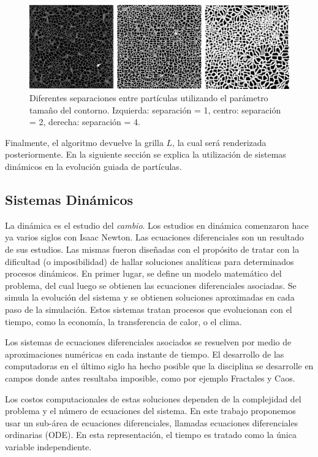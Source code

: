 \documentclass[oneside,a4paper,spanish,links]{amca}
\begin{document}
\begin{figure}[htb!]
  \centerline{\includegraphics[scale=0.22]{fig1.pdf}}
  \caption{Diferentes separaciones entre part\'iculas utilizando el par\'ametro tama\~no del contorno. Izquierda: separaci\'on = 1, centro: separaci\'on = 2, derecha: separaci\'on = 4.}
  \label{fg:fig1}
\end{figure}

Finalmente, el algoritmo devuelve la grilla $L$, la cual ser\'a renderizada posteriormente. En la siguiente secci\'on se explica la utilizaci\'on de sistemas din\'amicos en la evoluci\'on guiada de part\'iculas.

\subsection{Sistemas Din\'amicos}

La din\'amica es el estudio del {\em cambio}. Los estudios en din\'amica comenzaron hace ya va\-rios siglos con Isaac Newton. Las ecuaciones diferenciales son un resultado de sus estudios. Las mismas fueron dise\~nadas con el prop\'osito de tratar con la dificultad (o imposibilidad) de hallar soluciones anal\'iticas para determinados procesos din\'amicos. En primer lugar, se define un modelo matem\'atico del problema, del cual luego se obtienen 
las ecuaciones diferenciales asociadas. Se simula la evoluci\'on del sistema y se obtienen soluciones aproximadas en cada paso de la simulaci\'on. Estos sistemas tratan procesos que evolucionan con el tiempo, como la econom\'ia, la transferencia de calor, o el clima.

Los sistemas de ecuaciones diferenciales asociados se resuelven por medio de aproximaciones num\'ericas en cada instante de tiempo. El desarrollo de las computadoras en el \'ultimo siglo ha hecho posible que la disciplina se desarrolle en campos donde antes resultaba imposible, como por ejemplo Fractales \citep{Mandelbrot83} y Caos.

Los costos computacionales de estas soluciones dependen de la complejidad del problema y el n\'umero de ecuaciones del sistema. En este trabajo proponemos usar un sub-\'area de ecuaciones diferenciales, llamadas ecuaciones diferenciales ordinarias (ODE). En esta representaci\'on, el tiempo es tratado como la \'unica variable independiente.
\end{document}
